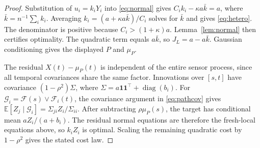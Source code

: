 \documentclass[letterpaper,10pt,conference]{ieeeconf}
\newcommand{\E}{\mathbb E}
\begin{document}
\begin{proof}
Substitution of $u_i=k_iY_i$ into \eqref{eq:normal} gives $C_i k_i-\kappa a\bar k=a$, where $\bar k=n^{-1}\sum_i k_i$. Averaging $k_i=(a+\kappa a\bar k)/C_i$ solves for $\bar k$ and gives \eqref{eq:hetero}. The denominator is positive because $C_i>(1+\kappa)a$. Lemma~\ref{lem:normal} then certifies optimality. The quadratic term equals $a\bar k$, so $J_L=a-a\bar k$. Gaussian conditioning gives the displayed $P$ and $\mu_P$.

The residual $X(t)-\mu_P(t)$ is independent of the entire sensor process, since all temporal covariances share the same factor. Innovations over $[s,t]$ have covariance $(1-\rho^2)\Sigma$, where $\Sigma=a\mathbf1\mathbf1^\top+\operatorname{diag}(b_i)$. For $\mathcal G_i=\mathcal F(s)\vee\mathcal F_i(t)$, the covariance argument in \eqref{eq:pathcov} gives $\E[Z_j\mid\mathcal G_i]=\Sigma_{ji}Z_i/\Sigma_{ii}$. After subtracting $\rho\mu_P(s)$, the target has conditional mean $aZ_i/(a+b_i)$. The residual normal equations are therefore the fresh-local equations above, so $k_iZ_i$ is optimal. Scaling the remaining quadratic cost by $1-\rho^2$ gives the stated cost law.
\end{proof}
\end{document}
